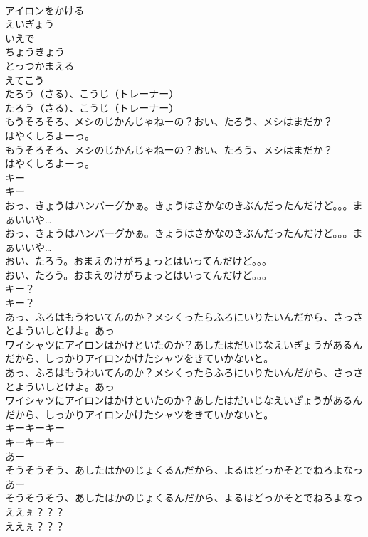 \documentclass[8pt]{extreport}
\begin{document}
\begin{CJK}{UTF8}{min}
\\	アイロンをかける
\\	えいぎょう
\\	いえで
\\	ちょうきょう
\\	とっつかまえる
\\	えてこう
\\	たろう（さる）、こうじ（トレーナー）
\\	たろう（さる）、こうじ（トレーナー）
\\	もうそろそろ、メシのじかんじゃねーの？おい、たろう、メシはまだか？
\\	はやくしろよーっ。
\\	もうそろそろ、メシのじかんじゃねーの？おい、たろう、メシはまだか？
\\	はやくしろよーっ。
\\	キー
\\	キー
\\	おっ、きょうはハンバーグかぁ。きょうはさかなのきぶんだったんだけど。。。まぁいいや…
\\	おっ、きょうはハンバーグかぁ。きょうはさかなのきぶんだったんだけど。。。まぁいいや…
\\	おい、たろう。おまえのけがちょっとはいってんだけど。。。
\\	おい、たろう。おまえのけがちょっとはいってんだけど。。。
\\	キー？
\\	キー？
\\	あっ、ふろはもうわいてんのか？メシくったらふろにいりたいんだから、さっさとよういしとけよ。あっ
\\	ワイシャツにアイロンはかけといたのか？あしたはだいじなえいぎょうがあるんだから、しっかりアイロンかけたシャツをきていかないと。
\\	あっ、ふろはもうわいてんのか？メシくったらふろにいりたいんだから、さっさとよういしとけよ。あっ
\\	ワイシャツにアイロンはかけといたのか？あしたはだいじなえいぎょうがあるんだから、しっかりアイロンかけたシャツをきていかないと。
\\	キーキーキー
\\	キーキーキー
\\	あー
\\	そうそうそう、あしたはかのじょくるんだから、よるはどっかそとでねろよなっ
\\	あー
\\	そうそうそう、あしたはかのじょくるんだから、よるはどっかそとでねろよなっ
\\	ええぇ？？？
\\	ええぇ？？？

\end{CJK}
\end{document}
